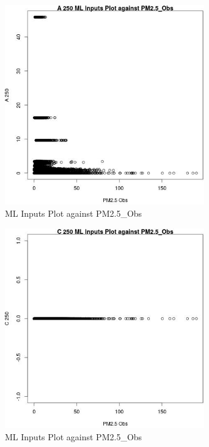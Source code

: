 \begin{figure} 
\centering  
\includegraphics[width=0.77\textwidth]{Code_Outputs/Report_ML_input_PM25_Step4_part_e_de_duplicated_aves_A_250vPM25_Obs.jpg} 
\caption{\label{fig:Report_ML_input_PM25_Step4_part_e_de_duplicated_avesA_250vPM25_Obs}ML Inputs Plot against PM2.5_Obs} 
\end{figure} 
 

\begin{figure} 
\centering  
\includegraphics[width=0.77\textwidth]{Code_Outputs/Report_ML_input_PM25_Step4_part_e_de_duplicated_aves_C_250vPM25_Obs.jpg} 
\caption{\label{fig:Report_ML_input_PM25_Step4_part_e_de_duplicated_avesC_250vPM25_Obs}ML Inputs Plot against PM2.5_Obs} 
\end{figure} 
 

